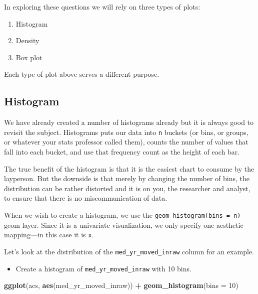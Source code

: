 \documentclass[
]{book}
\newenvironment{Shaded}{\begin{snugshade}}{\end{snugshade}}
\newcommand{\DataTypeTok}[1]{\textcolor[rgb]{0.13,0.29,0.53}{#1}}
\newcommand{\DecValTok}[1]{\textcolor[rgb]{0.00,0.00,0.81}{#1}}
\newcommand{\KeywordTok}[1]{\textcolor[rgb]{0.13,0.29,0.53}{\textbf{#1}}}
\newcommand{\NormalTok}[1]{#1}
\newcommand{\OperatorTok}[1]{\textcolor[rgb]{0.81,0.36,0.00}{\textbf{#1}}}
\newcommand{\StringTok}[1]{\textcolor[rgb]{0.31,0.60,0.02}{#1}}
\providecommand{\tightlist}{%
  \setlength{\itemsep}{0pt}\setlength{\parskip}{0pt}}
\begin{document}
In exploring these questions we will rely on three types of plots:

\begin{enumerate}
\def\labelenumi{\arabic{enumi}.}
\tightlist
\item
  Histogram
\item
  Density
\item
  Box plot
\end{enumerate}

Each type of plot above serves a different purpose.

\hypertarget{histogram}{%
\subsection{Histogram}\label{histogram}}

We have already created a number of histograms already but it is always good to revisit the subject. Histograms puts our data into \texttt{n} buckets (or bins, or groups, or whatever your stats professor called them), counts the number of values that fall into each bucket, and use that frequency count as the height of each bar.

The true benefit of the histogram is that it is the easiest chart to consume by the layperson. But the downside is that merely by changing the number of bins, the distribution can be rather distorted and it is on you, the researcher and analyst, to ensure that there is no miscommunication of data.

When we wish to create a histogram, we use the \texttt{geom\_histogram(bins\ =\ n)} geom layer. Since it is a univariate visualization, we only specify one aesthetic mapping---in this case it is \texttt{x}.

Let's look at the distribution of the \texttt{med\_yr\_moved\_inraw} column for an example.

\begin{itemize}
\tightlist
\item
  Create a histogram of \texttt{med\_yr\_moved\_inraw} with 10 bins.
\end{itemize}

\begin{Shaded}
\begin{Highlighting}[]
\KeywordTok{ggplot}\NormalTok{(acs, }\KeywordTok{aes}\NormalTok{(med\_yr\_moved\_inraw)) }\OperatorTok{+}
\StringTok{  }\KeywordTok{geom\_histogram}\NormalTok{(}\DataTypeTok{bins =} \DecValTok{10}\NormalTok{)}
\end{Highlighting}
\end{Shaded}
\end{document}
